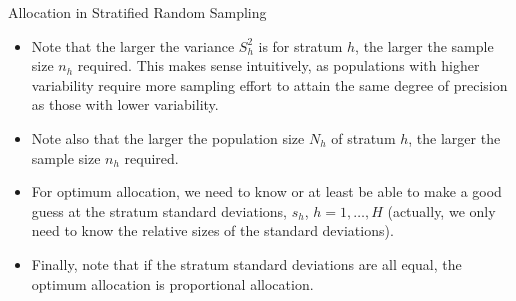 \documentclass[10pt]{beamer}\usepackage[]{graphicx}\usepackage[]{xcolor}
\begin{document}
\begin{frame}{Allocation in Stratified Random Sampling}
{\begin{enumerate}
\begin{itemize}
\item Note that the larger the variance $S_h^2$ is for stratum $h$, the larger the sample size $n_h$ required. This makes sense intuitively, as populations with higher variability require more sampling effort to attain the same degree of precision as those with lower variability.
\item Note also that the larger the population size $N_h$ of stratum $h$, the larger the sample size $n_h$ required.
\item For optimum allocation, we need to know or at least be able to make a good guess at the stratum standard deviations, $s_h$, $h = 1,\dots, H$ (actually, we only need to know the relative sizes of the standard deviations).
\item Finally, note that if the stratum standard deviations are all equal, the optimum allocation is proportional allocation.
\end{itemize}
\end{enumerate}
}
\end{frame}
\end{document}
